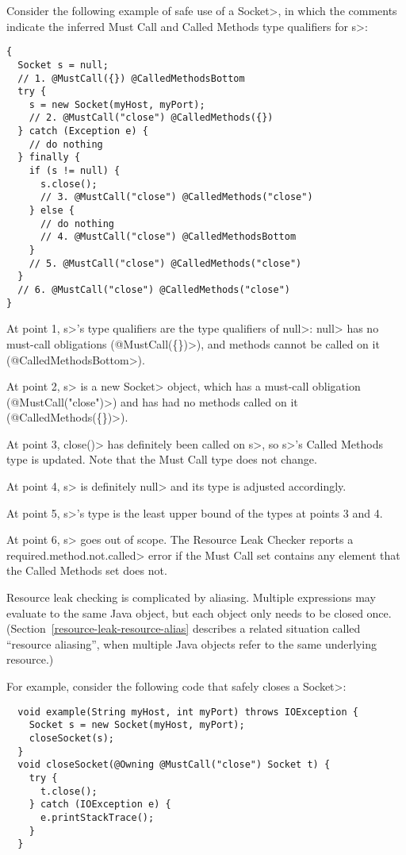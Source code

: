 Consider the following example of safe use of a \<Socket>, in which the comments indicate the
inferred Must Call and Called Methods type qualifiers for \<s>:
\begin{verbatim}
{
  Socket s = null;
  // 1. @MustCall({}) @CalledMethodsBottom
  try {
    s = new Socket(myHost, myPort);
    // 2. @MustCall("close") @CalledMethods({})
  } catch (Exception e) {
    // do nothing
  } finally {
    if (s != null) {
      s.close();
      // 3. @MustCall("close") @CalledMethods("close")
    } else {
      // do nothing
      // 4. @MustCall("close") @CalledMethodsBottom
    }
    // 5. @MustCall("close") @CalledMethods("close")
  }
  // 6. @MustCall("close") @CalledMethods("close")
}
\end{verbatim}

At point 1, \<s>'s type qualifiers are the type qualifiers of \<null>:
\<null> has no must-call obligations (\<@MustCall(\{\})>),
and methods cannot be called on it (\<@CalledMethodsBottom>).

At point 2, \<s> is a new \<Socket> object, which
has a must-call obligation (\<@MustCall("close")>)
and has had no methods called on it (\<@CalledMethods(\{\})>).

At point 3, \<close()> has definitely been called on \<s>, so
\<s>'s Called Methods type is updated. Note that the Must Call type
does not change.

At point 4, \<s> is definitely \<null> and its type is adjusted accordingly.

At point 5, \<s>'s type is the least upper bound of the types at points 3
and 4.

At point 6, \<s> goes out of scope.  The Resource Leak Checker reports a
\<required.method.not.called> error if the Must Call set contains any
element that the Called Methods set does not.



Resource leak checking is complicated by aliasing.  Multiple expressions
may evaluate to the same Java object, but each object only needs to be
closed once.  (Section~\ref{resource-leak-resource-alias} describes a
related situation called ``resource aliasing'', when multiple Java objects
refer to the same underlying resource.)

For example, consider the following code that safely closes a \<Socket>:

\begin{verbatim}
  void example(String myHost, int myPort) throws IOException {
    Socket s = new Socket(myHost, myPort);
    closeSocket(s);
  }
  void closeSocket(@Owning @MustCall("close") Socket t) {
    try {
      t.close();
    } catch (IOException e) {
      e.printStackTrace();
    }
  }
\end{verbatim}

